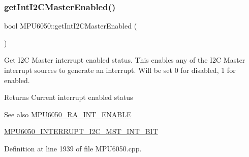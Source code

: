 \begin{DoxyCode}{0}

\end{DoxyCode}
\mbox{\label{classMPU6050_a282ae29e029d88604a59c92bdf9ce252}} 
\subsubsection{\texorpdfstring{getIntI2CMasterEnabled()}{getIntI2CMasterEnabled()}}
{\footnotesize\ttfamily bool M\+P\+U6050\+::get\+Int\+I2\+C\+Master\+Enabled (\begin{DoxyParamCaption}{ }\end{DoxyParamCaption})}

Get I2C Master interrupt enabled status. This enables any of the I2C Master interrupt sources to generate an interrupt. Will be set 0 for disabled, 1 for enabled. \begin{DoxyReturn}{Returns}
Current interrupt enabled status 
\end{DoxyReturn}
\begin{DoxySeeAlso}{See also}
\mbox{\hyperlink{MPU6050_8h_a1de9d9557aa7420c746721999df4a377}{M\+P\+U6050\+\_\+\+R\+A\+\_\+\+I\+N\+T\+\_\+\+E\+N\+A\+B\+LE}} 

\mbox{\hyperlink{MPU6050_8h_afb0bff7cde199d7806469f93b6e59b02}{M\+P\+U6050\+\_\+\+I\+N\+T\+E\+R\+R\+U\+P\+T\+\_\+\+I2\+C\+\_\+\+M\+S\+T\+\_\+\+I\+N\+T\+\_\+\+B\+IT}} 
\end{DoxySeeAlso}


Definition at line 1939 of file M\+P\+U6050.\+cpp.


